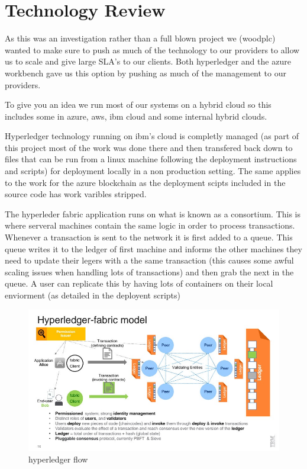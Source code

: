 \documentclass[runningheads]{llncs}
\begin{document}
\section{Technology Review}

As this was an investigation rather than a full blown project we (woodplc) wanted to make sure to push as much of the technology to our providers to allow us to scale and give large SLA's to our clients. Both hyperledger and the azure workbench gave us this option by pushing as much of the management to our providers. 

To give you an idea we run most of our systems on a hybrid cloud so this includes some in azure, aws, ibm cloud and some internal hybrid clouds. 

Hyperledger technology running on ibm's cloud is completly managed (as part of this project most of the work was done there and then transfered back down to files that can be run from a linux machine following the deployment instructions and scripts) for deployment locally in a non production setting. The same applies to the work for the azure blockchain as the deployment scipts included in the source code has work varibles stripped.

The hyperleder fabric application runs on what is known as a consortium. This is where serveral machines contain the same logic in order to process transactions. Whenever a transaction is sent to the network it is first added to a queue. This queue writes it to the ledger of first machine and informs the other machines they need to update their legers with a the same transaction (this causes some awful scaling issues when handling lots of transactions) and then grab the next in the queue. A user can replicate this by having lots of containers on their local enviorment (as detailed in the deployent scripts)


\begin{figure}
\center
\includegraphics[width=1.0\textwidth]{Hyperledger-Blockchain-model.jpg}
\caption{hyperledger flow}
\label{fig:conversion}
\end{figure}
\end{document}
